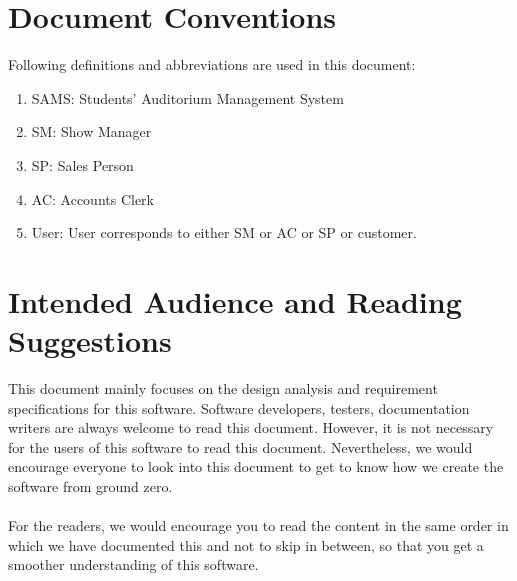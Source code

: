 \documentclass{scrreprt}
\begin{document}
\section{Document Conventions}

Following definitions and abbreviations are used in this document:
\begin{enumerate}
	\item SAMS: Students' Auditorium Management System
	\item SM: Show Manager
	\item SP: Sales Person
	\item AC: Accounts Clerk
	\item User: User corresponds to either SM or AC or SP or customer.
\end{enumerate}

\section{Intended Audience and Reading Suggestions}

This document mainly focuses on the design analysis and requirement specifications for this software. Software developers, testers, documentation writers are always welcome to read this document. However, it is not necessary for the users of this software to read this document. Nevertheless, we would encourage everyone to look into this document to get to know how we create the software from ground zero.
\\ \\
For the readers, we would encourage you to read the content in the same order in which we have documented this and not to skip in between, so that you get a smoother understanding of this software. 
\end{document}
